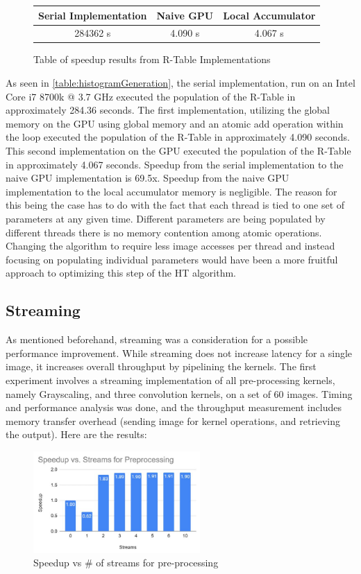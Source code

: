 \documentclass[conference]{IEEEtran}
\begin{document}
\begin{figure}[h]
\begin{center}
\begin{tabular}{ |c|c|c| } 
 \hline
 Serial Implementation & Naive GPU & Local Accumulator \\ 
 \hline
 284362 s & 4.090 s & 4.067 s \\
 \hline
\end{tabular}\caption{Table of speedup results from R-Table Implementations}\label{table:histogramGeneration}
\end{center}
\end{figure}

As seen in \autoref{table:histogramGeneration}, the serial implementation, run on an Intel Core i7 8700k @ 3.7 GHz executed the population of the R-Table in approximately 284.36 seconds.
The first implementation, utilizing the global memory on the GPU using global memory and an atomic add operation within the loop executed the population of the R-Table in approximately 4.090 seconds.
This second implementation on the GPU executed the population of the R-Table in approximately 4.067 seconds.
Speedup from the serial implementation to the naive GPU implementation is 69.5x.
Speedup from the naive GPU implementation to the local accumulator memory is negligible. 
The reason for this being the case has to do with the fact that each thread is tied to one set of parameters at any given time.
Different parameters are being populated by different threads there is no memory contention among atomic operations. 
Changing the algorithm to require less image accesses per thread and instead focusing on populating individual parameters would have been a more fruitful approach to optimizing this step of the HT algorithm.\label{section:histogramGeneration}


\subsection{Streaming}
As mentioned beforehand, streaming was a consideration for a possible performance improvement. While streaming does not increase latency for a single image, it increases overall throughput by pipelining the kernels. The first experiment involves a streaming implementation of all pre-processing kernels, namely Grayscaling, and three convolution kernels, on a set of 60 images. Timing and performance analysis was done, and the throughput measurement includes memory transfer overhead (sending image for kernel operations, and retrieving the output). Here are the results:
\begin{figure}[ht]
\centering
\includegraphics[width=2.5in]{images/StreamingPreProcessing}\caption{Speedup vs \# of streams for pre-processing}\label{figure:streamPreProcess}
\end{figure}
\end{document}
